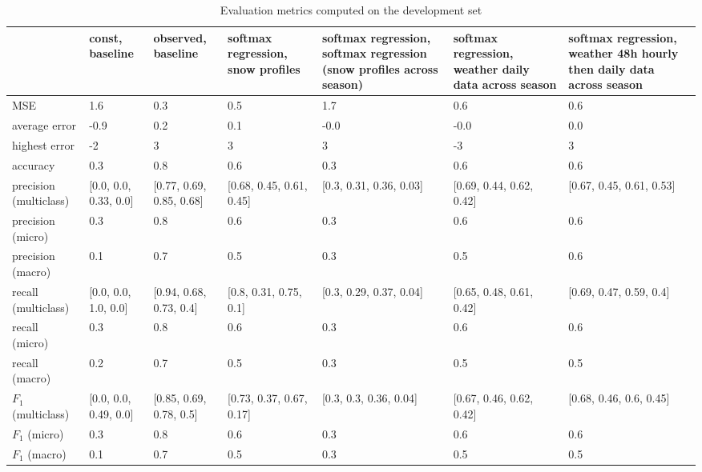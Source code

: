\begin{table}[H]
\caption{Evaluation metrics computed on the development set}
\label{tbl:sais_eval_development}
\begin{tabular}{lllllll}
\toprule
 & const, baseline & observed, baseline & softmax regression, snow profiles & softmax regression, softmax regression (snow profiles across season) & softmax regression, weather daily data across season & softmax regression, weather 48h hourly then daily data across season \\
\midrule
MSE & 1.6 & 0.3 & 0.5 & 1.7 & 0.6 & 0.6 \\
average error & -0.9 & 0.2 & 0.1 & -0.0 & -0.0 & 0.0 \\
highest error & -2 & 3 & 3 & 3 & -3 & 3 \\
accuracy & 0.3 & 0.8 & 0.6 & 0.3 & 0.6 & 0.6 \\
precision (multiclass) & [0.0, 0.0, 0.33, 0.0] & [0.77, 0.69, 0.85, 0.68] & [0.68, 0.45, 0.61, 0.45] & [0.3, 0.31, 0.36, 0.03] & [0.69, 0.44, 0.62, 0.42] & [0.67, 0.45, 0.61, 0.53] \\
precision (micro) & 0.3 & 0.8 & 0.6 & 0.3 & 0.6 & 0.6 \\
precision (macro) & 0.1 & 0.7 & 0.5 & 0.3 & 0.5 & 0.6 \\
recall (multiclass) & [0.0, 0.0, 1.0, 0.0] & [0.94, 0.68, 0.73, 0.4] & [0.8, 0.31, 0.75, 0.1] & [0.3, 0.29, 0.37, 0.04] & [0.65, 0.48, 0.61, 0.42] & [0.69, 0.47, 0.59, 0.4] \\
recall (micro) & 0.3 & 0.8 & 0.6 & 0.3 & 0.6 & 0.6 \\
recall (macro) & 0.2 & 0.7 & 0.5 & 0.3 & 0.5 & 0.5 \\
$F_1$ (multiclass) & [0.0, 0.0, 0.49, 0.0] & [0.85, 0.69, 0.78, 0.5] & [0.73, 0.37, 0.67, 0.17] & [0.3, 0.3, 0.36, 0.04] & [0.67, 0.46, 0.62, 0.42] & [0.68, 0.46, 0.6, 0.45] \\
$F_1$ (micro) & 0.3 & 0.8 & 0.6 & 0.3 & 0.6 & 0.6 \\
$F_1$ (macro) & 0.1 & 0.7 & 0.5 & 0.3 & 0.5 & 0.5 \\
\bottomrule
\end{tabular}
\end{table}
